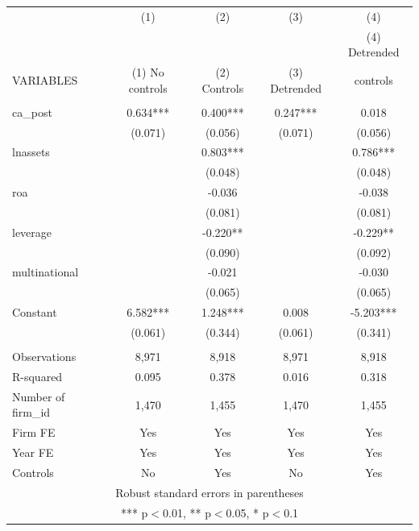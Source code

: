 \begin{tabular}{lcccc} \hline
 & (1) & (2) & (3) & (4) \\
 &  &  &  & (4) Detrended \\
VARIABLES & (1) No controls & (2) Controls & (3) Detrended & controls \\ \hline
 &  &  &  &  \\
ca\_post & 0.634*** & 0.400*** & 0.247*** & 0.018 \\
 & (0.071) & (0.056) & (0.071) & (0.056) \\
lnassets &  & 0.803*** &  & 0.786*** \\
 &  & (0.048) &  & (0.048) \\
roa &  & -0.036 &  & -0.038 \\
 &  & (0.081) &  & (0.081) \\
leverage &  & -0.220** &  & -0.229** \\
 &  & (0.090) &  & (0.092) \\
multinational &  & -0.021 &  & -0.030 \\
 &  & (0.065) &  & (0.065) \\
Constant & 6.582*** & 1.248*** & 0.008 & -5.203*** \\
 & (0.061) & (0.344) & (0.061) & (0.341) \\
 &  &  &  &  \\
Observations & 8,971 & 8,918 & 8,971 & 8,918 \\
R-squared & 0.095 & 0.378 & 0.016 & 0.318 \\
Number of firm\_id & 1,470 & 1,455 & 1,470 & 1,455 \\
Firm FE & Yes & Yes & Yes & Yes \\
Year FE & Yes & Yes & Yes & Yes \\
 Controls & No & Yes & No & Yes \\ \hline
\multicolumn{5}{c}{ Robust standard errors in parentheses} \\
\multicolumn{5}{c}{ *** p$<$0.01, ** p$<$0.05, * p$<$0.1} \\
\end{tabular}
